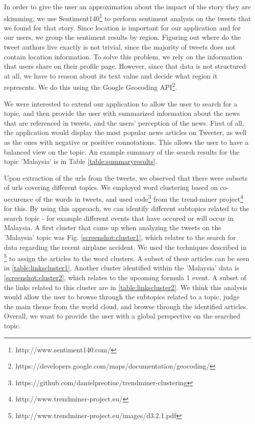 \documentclass{acm_proc_10ptArticle-sp}
\begin{document}
In order to give the user an approximation about the impact of the story they are skimming, we use Sentiment140\footnote{http://www.sentiment140.com/} to perform sentiment analysis on the tweets that we found for that story. Since location is important for our application and for our users, we group the sentiment results by region. Figuring out where do the tweet authors live exactly is not trivial, since the majority of tweets does not contain location information. To solve this problem, we rely on the information that users share on their profile page. However, since that data is not structured at all, we have to reason about its text value and decide what region it represents. We do this using the Google Geocoding API\footnote{https://developers.google.com/maps/documentation/geocoding/}. 

We were interested to extend our application to allow the user to search for a topic, and then provide the user with summarized information about the news that are referenced in tweets, and the users' perception of the news. First of all, the application would display the most popular news articles on Tweeter, as well as the ones with negative or positive connotations. This allows the user to have a balanced view on the topic. An example summary of the search results for the topic 'Malaysia' is in Table \ref{table:summaryresults}. 

Upon extraction of the urls from the tweets, we observed that there were subsets of urls covering different topics. We employed word clustering based on co-occurence of the words in tweets, and used code\footnote{https://github.com/danielpreotiuc/trendminer-clustering} from the trend-miner project\footnote{http://www.trendminer-project.eu/} for this. By using this approach, we can identify different subtopics related to the search topic - for example different events that have occured or will occur in Malaysia. A first cluster that came up when analyzing the tweets on the 'Malaysia' topic was Fig. \ref{screenshot:cluster1}, which relates to the search for data regarding the recent airplane accident. We used the techniques described in \footnote{http://www.trendminer-project.eu/images/d3.2.1.pdf} to assign the articles to the word clusters. A subset of these articles can be seen in \ref{table:linkscluster1}. Another cluster identified within the 'Malaysia' data is \ref{screenshot:cluster2}, which relates to the upcoming formula 1 event. A subset of the links related to this cluster are in \ref{table:linkscluster2}. We think this analysis would allow the user to browse through the subtopics related to a topic, judge the main theme from the world cloud, and browse through the identified articles. Overall, we want to provide the user with a global perspective on the searched topic. 
\end{document}
